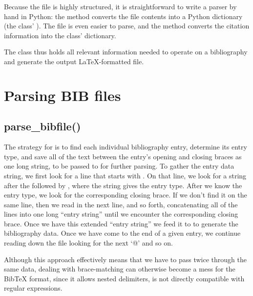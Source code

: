\documentclass[letterpaper,10pt,english]{sphinxmanual}
\begin{document}
Because the  file is highly structured, it is straightforward to write a parser by hand in Python: the  method converts the  file contents into a Python dictionary (the  class’ ). The  file is even easier to parse, and the  method converts the citation information into the  class’  dictionary.

The  class thus holds all relevant information needed to operate on a bibliography and generate the output LaTeX-formatted  file.


\section{Parsing BIB files}
\label{\detokenize{developer_guide:parsing-bib-files}}

\subsection{parse\_bibfile()}
\label{\detokenize{developer_guide:parse-bibfile}}
The strategy for  is to find each individual bibliography entry, determine its entry type, and save all of the text between the entry’s opening and closing braces as one long string, to be passed to  for further parsing. To gather the entry data string, we first look for a line that starts with . On that line, we look for a string after the  followed by \sphinxcode{\sphinxupquote{\{}}, where the string gives the entry type. After we know the entry type, we look for the corresponding closing brace. If we don’t find it on the same line, then we read in the next line, and so forth, concatenating all of the lines into one long “entry string” until we encounter the corresponding closing brace. Once we have this extended “entry string” we feed it to  to generate the bibliography data. Once we have come to the end of a given entry, we continue reading down the file looking for the next ‘@’ and so on.

Although this approach effectively means that we have to pass twice through the same data, dealing with brace-matching can otherwise become a mess for the BibTeX format, since it allows nested delimiters, is not directly compatible with regular expressions.
\end{document}
